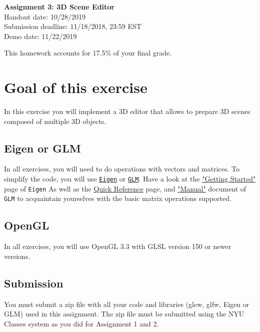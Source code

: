 \documentclass[11pt]{article}
\begin{document}
\hspace{50pt}

\begin{center}

{\Huge \textbf{Assignment 3: 3D Scene Editor}}\\
\vspace{10pt}
Handout date: 10/28/2019\\
Submission deadline: 11/18/2018,  23:59 EST\\
Demo date: 11/22/2019
\end{center}

\noindent This homework accounts for 17.5\% of your final grade. 

\section*{Goal of this exercise}
In this exercise you will implement a 3D editor that allows to prepare 3D scenes composed of multiple 3D objects.

\subsection*{Eigen or GLM}
In all exercises, you will need to do operations with vectors and matrices. To simplify the code, you will use \href{http://eigen.tuxfamily.org/}{\texttt{Eigen}} or \href{https://glm.g-truc.net/0.9.9/index.html}{\texttt{GLM}}. 
Have a look at the \href{http://eigen.tuxfamily.org/dox/GettingStarted.html}{"Getting Started"} page of \texttt{Eigen} As well as the \href{http://eigen.tuxfamily.org/dox/group__QuickRefPage.html}{Quick Reference} page, and \href{https://github.com/g-truc/glm/blob/0.9.9.2/doc/manual.pdf}{"Manual"} document of \texttt{GLM} to acquaintain yourselves with the basic matrix operations supported. 

\subsection*{OpenGL}
In all exercises, you will use OpenGL 3.3 with GLSL version 150 or newer versions.

\subsection*{Submission}

You must submit a zip file with all your code and libraries (glew, glfw, Eigen or GLM) used in this assignment. The zip file must be submitted using the NYU Classes system as you did for Assignment 1 and 2. 
\end{document}
